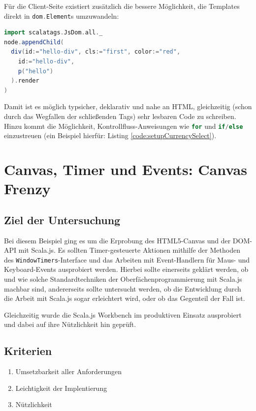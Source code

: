 \documentclass[a4paper, 12pt, hidelinks, listof=totoc, listoftables=totoc, bibliography=totoc]{scrreprt}
\newcommand{\code}[1]{\lstinline[language=Scala, style=inline]|#1|}
\newcommand{\scala}[1]{\lstinline[language=Scala, style=inline]|#1|}
\begin{document}
Für die Client-Seite existiert zusätzlich die bessere Möglichkeit, die Templates direkt in \scala{dom.Element}s umzuwandeln:

\begin{lstlisting}[language=Scala, caption={HTML-Generierung mit ScalaTags und Nodes.}]
import scalatags.JsDom.all._
node.appendChild(
  div(id:="hello-div", cls:="first", color:="red",
    id:="hello-div",
    p("hello")
  ).render
)
\end{lstlisting}

Damit ist es möglich typsicher, deklarativ und nahe an HTML, gleichzeitig (schon durch das Wegfallen der schließenden Tags) sehr lesbaren Code zu schreiben. Hinzu kommt die Möglichkeit, Kontrollfluss-Anweisungen wie \scala{for} und \scala{if/else} einzustreuen (ein Beispiel hierfür: Listing \ref{code:setupCurrencySelect}).



\section{Canvas, Timer und Events: Canvas Frenzy}

\subsection{Ziel der Untersuchung}

Bei diesem Beispiel ging es um die Erprobung des HTML5-Canvas und der DOM-API mit Scala.js. Es sollten Timer-gesteuerte Aktionen mithilfe der Methoden des \code{WindowTimers}-Interface und das Arbeiten mit Event-Handlern für Maus- und Keyboard-Events ausprobiert werden. Hierbei sollte einerseits geklärt werden, ob und wie solche Standardtechniken der Oberfächenprogrammierung mit Scala.js machbar sind, andererseits sollte untersucht werden, ob die Entwicklung durch die Arbeit mit Scala.js sogar erleichtert wird, oder ob das Gegenteil der Fall ist.

Gleichzeitig wurde die Scala.js Workbench im produktiven Einsatz ausprobiert und dabei auf ihre Nützlichkeit hin geprüft.

\subsection{Kriterien}

\begin{enumerate}
	\item Umsetzbarkeit aller Anforderungen
	\item Leichtigkeit der Implentierung
	\item Nützlichkeit
\end{enumerate}
\end{document}
